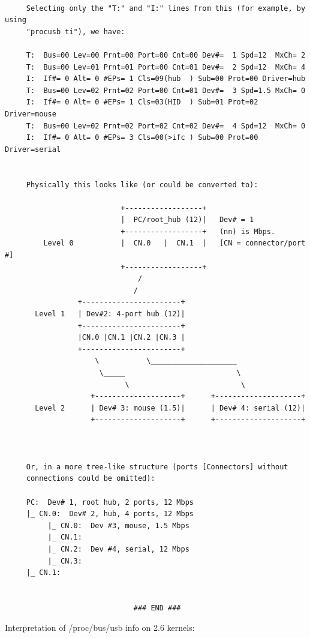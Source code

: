 {{{{{{{{{{{{{{{{{\begin{verbatim}
     
     Selecting only the "T:" and "I:" lines from this (for example, by using
     "procusb ti"), we have:
     
     T:  Bus=00 Lev=00 Prnt=00 Port=00 Cnt=00 Dev#=  1 Spd=12  MxCh= 2
     T:  Bus=00 Lev=01 Prnt=01 Port=00 Cnt=01 Dev#=  2 Spd=12  MxCh= 4
     I:  If#= 0 Alt= 0 #EPs= 1 Cls=09(hub  ) Sub=00 Prot=00 Driver=hub
     T:  Bus=00 Lev=02 Prnt=02 Port=00 Cnt=01 Dev#=  3 Spd=1.5 MxCh= 0
     I:  If#= 0 Alt= 0 #EPs= 1 Cls=03(HID  ) Sub=01 Prot=02 Driver=mouse
     T:  Bus=00 Lev=02 Prnt=02 Port=02 Cnt=02 Dev#=  4 Spd=12  MxCh= 0
     I:  If#= 0 Alt= 0 #EPs= 3 Cls=00(>ifc ) Sub=00 Prot=00 Driver=serial
     
     
     Physically this looks like (or could be converted to):
     
                           +------------------+
                           |  PC/root_hub (12)|   Dev# = 1
                           +------------------+   (nn) is Mbps.
         Level 0           |  CN.0   |  CN.1  |   [CN = connector/port #]
                           +------------------+
                               /
                              /
                 +-----------------------+
       Level 1   | Dev#2: 4-port hub (12)|
                 +-----------------------+
                 |CN.0 |CN.1 |CN.2 |CN.3 |
                 +-----------------------+
                     \           \____________________
                      \_____                          \
                            \                          \
                    +--------------------+      +--------------------+
       Level 2      | Dev# 3: mouse (1.5)|      | Dev# 4: serial (12)|
                    +--------------------+      +--------------------+
     
     
     
     Or, in a more tree-like structure (ports [Connectors] without
     connections could be omitted):
     
     PC:  Dev# 1, root hub, 2 ports, 12 Mbps
     |_ CN.0:  Dev# 2, hub, 4 ports, 12 Mbps
          |_ CN.0:  Dev #3, mouse, 1.5 Mbps
          |_ CN.1:
          |_ CN.2:  Dev #4, serial, 12 Mbps
          |_ CN.3:
     |_ CN.1:
     
     
                              ### END ###
\end{verbatim}
\normalsize

Interpretation of /proc/bus/usb info on 2.6 kernels: 

\footnotesize
\begin{verbatim}
     

\end{verbatim}}}}}}}}}}}}}}}}}}
